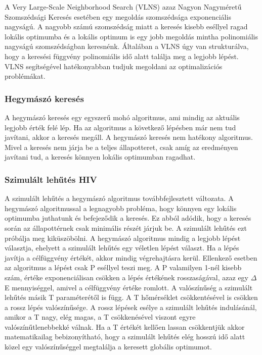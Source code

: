 A Very Large-Scale Neighborhood Search (VLNS) azaz Nagyon Nagyméretű Szomszédsági Keresés  esetében egy megoldás szomszédsága exponenciális nagyságú. A nagyobb számú szomszédság miatt a keresés kisebb eséllyel ragad lokális optimumba és a lokális optimum is egy jobb megoldás mintha polinomiális nagyságú szomszédságban keresnénk. Általában a VLNS úgy van strukturálva, hogy a keresési függvény polinomiális idő alatt találja meg a legjobb lépést. VLNS segítségével hatékonyabban tudjuk megoldani az optimalizációs problémákat. 

\cite{Mouthuy:2012}



\subsubsection{Hegymászó keresés}

A hegymászó keresés egy egyszerű mohó algoritmus, ami mindig az aktuális legjobb érték felé lép. Ha az algoritmus a következő lépésben már nem tud javítani, akkor a keresés megáll. A hegymászó keresés nem hatékony algoritmus. Mivel a keresés nem járja be a teljes állapotteret, csak amíg az eredményen javítani tud, a keresés könnyen lokális optimumban ragadhat.

\subsubsection{Szimulált lehűtés HIV}


A szimulált lehűtés a hegymászó algoritmus továbbfejlesztett változata. A hegymászó algoritmussal a legnagyobb probléma, hogy könnyen egy lokális optimumba juthatunk és befejeződik a keresés. Ez abból adódik, hogy a keresés során az állapottérnek csak minimális részét járjuk be. A szimulált lehűtés ezt próbálja meg kiküszöbölni. A hegymászó algoritmus mindig a legjobb lépést választja, ehelyett a szimulált lehűtés egy véletlen lépést választ. Ha a lépés javítja a célfüggvény értékét, akkor mindig végrehajtásra kerül. Ellenkező esetben az algoritmus a lépést csak P eséllyel teszi meg. A P valamilyen 1-nél kisebb szám, értéke exponenciálisan csökken a lépés értékének rosszaságával, azaz egy  $\Delta$ E mennyiséggel, amivel a célfüggvény értéke romlott. A valószínűség a szimulált lehűtés másik T paraméterétől is függ. A T hőmérséklet csökkentésével is csökken a rossz lépés valószínűsége. A rossz lépések esélye a szimulált lehűtés indulásánál, amikor a T nagy, elég magas, a T csökkenésével viszont egyre valószínűtlenebbekké válnak. Ha a T értékét kellően lassan csökkentjük akkor matematikailag bebizonyítható, hogy a szimulált lehűtés elég hosszú idő alatt közel egy valószínűséggel megtalálja a keresett globális optimumot.

